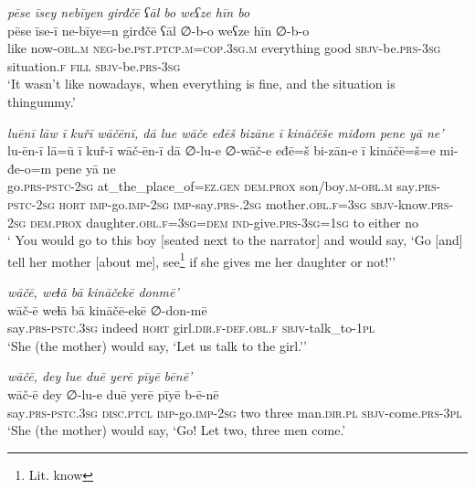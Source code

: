 \ea \label{ŽE.72}
\textit{pēse īsey nebīyen girđčē ʕāl bo weʕze hīn bo} \\ 
\gll pēse īse-ī ne-bīye=n girđčē ʕāl ∅-b-o weʕze hīn ∅-b-o \\ 
  like now\textsc{-obl}\textsc{.m} \textsc{neg-}be\textsc{.pst}\textsc{.ptcp}\textsc{.m}\textsc{=cop}\textsc{.3sg}\textsc{.m} everything good \textsc{sbjv-}be\textsc{.prs}\textsc{-3sg} situation\textsc{.f} \textsc{fill} \textsc{sbjv-}be\textsc{.prs}\textsc{-3sg} \\ 
\glt `It wasn’t like nowadays, when everything is fine, and the situation is thingummy.'
\z 
 
\ea \label{ŽE.74}
\textit{luēnī lāw ī kuřī wāčēnī, dā lue wāče eđēš bizāne ī kināčēše miđom pene yā ne’} \\ 
\gll lu-ēn-ī lā=ū ī kuř-ī wāč-ēn-ī dā ∅-lu-e ∅-wāč-e eđē=š bi-zān-e ī kināčē=š=e mi-đe-o=m pene yā ne \\ 
 go\textsc{.prs}\textsc{-pstc}-\textsc{2sg} at\_the\_place\_of\textsc{\textsc{=ez.gen}} \textsc{dem.prox} son/boy\textsc{.m}\textsc{-obl}\textsc{.m} say\textsc{.prs}\textsc{-pstc}-\textsc{2sg} \textsc{hort} \textsc{imp-}go.\textsc{imp-}\textsc{2sg} \textsc{imp-}say\textsc{.prs-}.\textsc{2sg} mother\textsc{.obl}\textsc{.f}\textsc{=3sg} \textsc{sbjv-}know\textsc{.prs}-\textsc{2sg} \textsc{dem.prox} daughter\textsc{.obl}\textsc{.f}\textsc{=3sg}\textsc{=dem} \textsc{ind-}give\textsc{.prs}\textsc{-3sg}\textsc{=\textsc{1sg}} to either no \\ 
\glt ` You would go to this boy [seated next to the narrator] and would say, ‘Go [and] tell her mother [about me], see\footnote{Lit. know} if she gives me her daughter or not!’'
\z 
 
\ea \label{ŽE.76}
\textit{wāčē, weɫā bā kināčekē donmē’} \\ 
\gll wāč-ē weɫā bā kināčē-ekē ∅-don-mē \\ 
 say\textsc{.prs-pstc}\textsc{.3sg} indeed \textsc{hort} girl\textsc{.dir}\textsc{.f}\textsc{-def}\textsc{.obl}\textsc{.f} \textsc{sbjv-}talk\_to\textsc{-1pl} \\ 
\glt `She (the mother) would say, ‘Let us talk to the girl.’'
\z 
 
\ea \label{ŽE.78}
\textit{wāčē, dey lue duē yerē pīyē bēnē’} \\ 
\gll wāč-ē dey ∅-lu-e duē yerē pīyē b-ē-nē \\ 
 say\textsc{.prs-pstc}\textsc{.3sg} \textsc{disc.}\textsc{ptcl} \textsc{imp-}go.\textsc{imp-}\textsc{2sg} two three man\textsc{.dir}\textsc{.pl} \textsc{sbjv-}come\textsc{.prs}\textsc{-3pl} \\ 
\glt `She (the mother) would say, ‘Go! Let two, three men come.'
\z 
 
